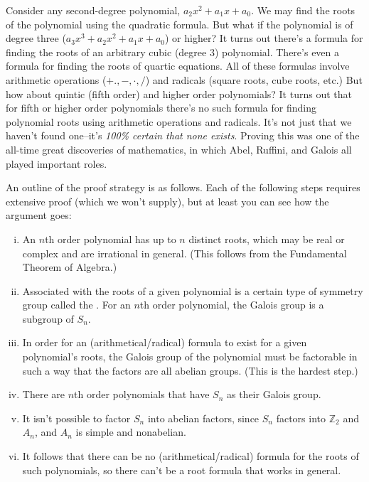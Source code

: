 {Consider any second-degree polynomial, $a_2x^2 + a_1x + a_0$.  We may find the roots of the polynomial using the quadratic formula.  But what if the polynomial is of degree three ($a_3x^3 + a_2x^2 + a_1x + a_0$) or higher?  It turns out there's a formula  for finding the roots of an arbitrary cubic (degree 3) polynomial. There's even a formula for finding the roots of  quartic equations.  All of these formulas involve arithmetic operations ($+.,-,\cdot,/$) and radicals (square roots, cube roots, etc.)  But how about quintic (fifth order) and higher order polynomials?  It turns out that for fifth or higher order polynomials there's no such formula for finding polynomial roots using arithmetic operations and radicals.  It's not just that we haven't found one--it's \emph{100\% certain that none exists}. Proving this was one of the all-time great discoveries of mathematics, in which Abel, Ruffini, and Galois all played important roles.  

An outline of the proof strategy is as follows. Each of the following steps requires extensive proof (which we won't supply), but at least you can see how the argument goes:
\begin{enumerate}[(i)]
\item
An $n$th order polynomial has up to $n$ distinct roots, which may be real or complex and are irrational in general. (This follows from the Fundamental Theorem of Algebra.)
\item 
Associated with the roots of a given polynomial  is a certain type of symmetry group called the . For an $n$th order polynomial, the Galois group is a subgroup of $S_n$. 
\item
In order for an (arithmetical/radical) formula to exist for a given polynomial's roots, the Galois group of the polynomial must be factorable in such a way that the factors are all abelian groups.  (This is the hardest step.) 
\item
There are $n$th order polynomials that have $S_n$ as their Galois group. 
\item
It isn't possible to factor $S_n$ into abelian factors, since $S_n$ factors into $\mathbb{Z}_2$ and $A_n$, and $A_n$ is simple and nonabelian.  
\item
It follows that there can be no (arithmetical/radical) formula for the roots of such polynomials, so there can't be a root formula that works in general.
\end{enumerate}

}
